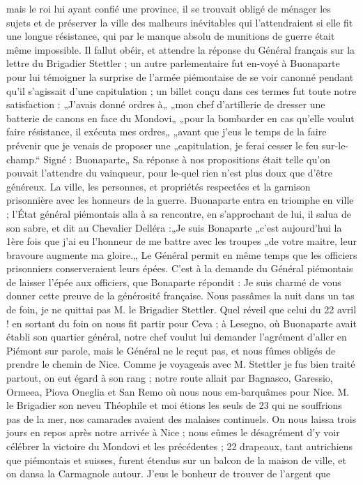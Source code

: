 \documentclass[12pt]{article}
\begin{document}
 mais le roi lui ayant confié une province, il se trouvait
obligé de ménager les sujets et de préserver la ville des malheurs inévitables qui l’attendraient si
elle fit une longue résistance, qui par le manque absolu de munitions de guerre était même
impossible. Il fallut obéir, et attendre la réponse du Général français sur la lettre du Brigadier
Stettler ; un autre parlementaire fut en-voyé à Buonaparte pour lui témoigner la surprise de l’armée
piémontaise de se voir canonné pendant qu’il s’agissait d’une capitulation ; un billet conçu dans
ces termes fut toute notre satisfaction : „J’avais donné ordres à„ „mon chef d’artillerie de dresser
une batterie de canons en face du Mondovi„ „pour la bombarder en cas qu’elle voulut faire
résistance, il exécuta mes ordres„ „avant que j’eus le temps de la faire prévenir que je venais de
proposer une „capitulation, je ferai cesser le feu sur-le-champ.“ Signé : Buonaparte„ Sa réponse à
nos propositions était telle qu’on pouvait l’attendre du vainqueur, pour le-quel rien n’est plus
doux que d’être généreux. La ville, les personnes, et propriétés respectées et la garnison
prisonnière avec les honneurs de la guerre. Buonaparte entra en triomphe en ville ; l’État général
piémontais alla à sa rencontre, en s’approchant de lui, il salua de son sabre, et dit au Chevalier
Delléra :„Je suis Bonaparte „c’est aujourd’hui la 1ère fois que j’ai eu l’honneur de me battre avec
les troupes „de votre maitre, leur bravoure augmente ma gloire.„ Le Général permit en même temps que
les officiers prisonniers conserveraient leurs épées. C’est à la demande du Général piémontais de
laisser l’épée aux officiers, que Bonaparte répondit : Je suis charmé de vous donner cette preuve de
la générosité française. Nous passâmes la nuit dans un tas de foin, je ne quittai pas M. le
Brigadier Stettler. Quel réveil que celui du 22 avril ! en sortant du foin on nous fit partir pour
Ceva ; à Lesegno, où Buonaparte avait établi son quartier général, notre chef voulut lui demander
l’agrément d’aller en Piémont sur parole, mais le Général ne le reçut pas, et nous fûmes obligés de
prendre le chemin de Nice. Comme je voyageais avec M. Stettler je fus bien traité partout, on eut
égard à son rang ; notre route allait par Bagnasco, Garessio, Ormeea, Piova Oneglia et San Remo où
nous nous em-barquâmes pour Nice. M. le Brigadier son neveu Théophile et moi étions les seuls de 23
qui ne souffrions pas de la mer, nos camarades avaient des malaises continuels. On nous laissa trois
jours en repos après notre arrivée à Nice ; nous eûmes le désagrément d’y voir célébrer la victoire
du Mondovi et les précédentes ; 22 drapeaux, tant autrichiens que piémontais et suisses, furent
étendus sur un balcon de la maison de ville, et on dansa la Carmagnole autour. J’eus le bonheur de
trouver de l’argent que
\end{document}
